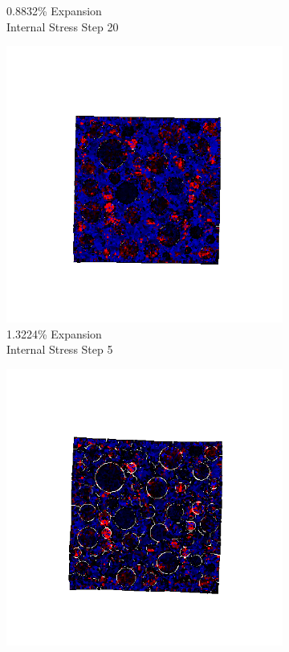 \begin{figure}[h!]
\begin{subfigure}{.25\textwidth}
      \caption{0.8832\% Expansion\\Internal Stress Step 20}
    \end{subfigure}

    \begin{subfigure}{.25\textwidth}
      \centering
      \includegraphics[width=1.0\linewidth]{Files/exp_3D/ASR/A30P75_5_s5.png}
      \caption{1.3224\% Expansion\\Internal Stress Step 5}
    \end{subfigure}%
    \begin{subfigure}{.25\textwidth}
      \centering
      \includegraphics[width=1.0\linewidth]{Files/exp_3D/ASR/A30P75_5_s10.png}

\end{subfigure}
\end{figure}
